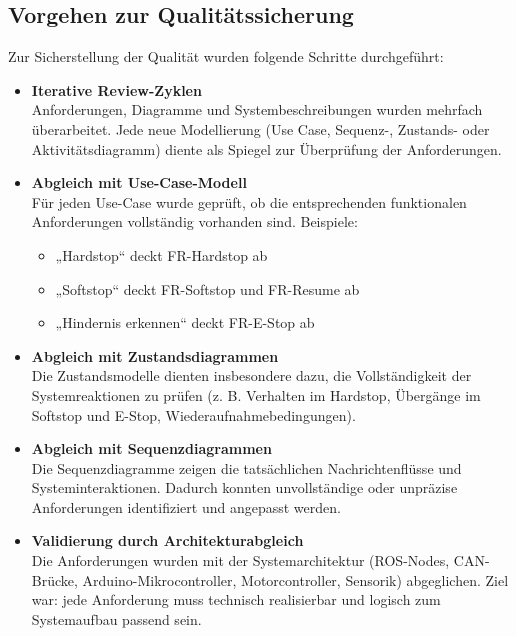 \subsection{Vorgehen zur Qualitätssicherung}

Zur Sicherstellung der Qualität wurden folgende Schritte durchgeführt:

\begin{itemize}
    \item \textbf{Iterative Review-Zyklen}\\
    Anforderungen, Diagramme und Systembeschreibungen wurden mehrfach überarbeitet. Jede neue Modellierung (Use Case, Sequenz-, Zustands- oder Aktivitätsdiagramm) diente als Spiegel zur Überprüfung der Anforderungen.

    \item \textbf{Abgleich mit Use-Case-Modell}\\
    Für jeden Use-Case wurde geprüft, ob die entsprechenden funktionalen Anforderungen vollständig vorhanden sind.  
    Beispiele:
    \begin{itemize}
        \item „\ac{Hardstop}“ deckt FR-Hardstop ab
        \item „\ac{Softstop}“ deckt FR-Softstop und FR-Resume ab
        \item „Hindernis erkennen“ deckt FR-E-Stop ab
    \end{itemize}

    \item \textbf{Abgleich mit Zustandsdiagrammen}\\
    Die Zustandsmodelle dienten insbesondere dazu, die Vollständigkeit der Systemreaktionen zu prüfen 
    (z. B. Verhalten im \ac{Hardstop}, Übergänge im \ac{Softstop} und \ac{E-Stop}, Wiederaufnahmebedingungen).

    \item \textbf{Abgleich mit Sequenzdiagrammen}\\
    Die Sequenzdiagramme zeigen die tatsächlichen Nachrichtenflüsse und Systeminteraktionen. Dadurch konnten unvollständige oder unpräzise Anforderungen identifiziert und angepasst werden.

    \item \textbf{Validierung durch Architekturabgleich}\\
    Die Anforderungen wurden mit der Systemarchitektur (ROS-Nodes, CAN-Brücke, Arduino-Mikrocontroller, Motorcontroller, Sensorik) abgeglichen.  
    Ziel war: jede Anforderung muss technisch realisierbar und logisch zum Systemaufbau passend sein.
\end{itemize}

